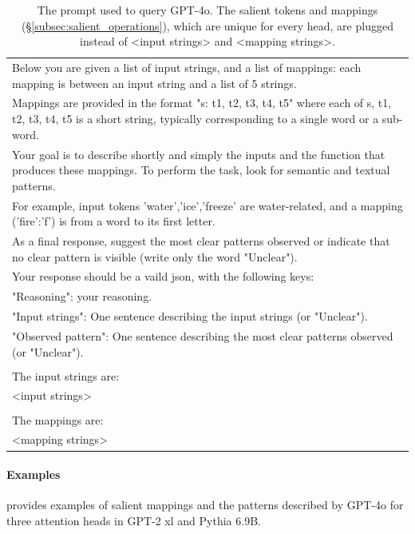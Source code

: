\documentclass[11pt]{article}
\newcommand{\PythiaSevenB}{Pythia 6.9B}
\newcommand{\GPTxl}{GPT-2 xl}
\newcommand{\GPTFourO}{GPT-4o}
\begin{document}
\begin{table}[htbp]
\footnotesize
\begin{tabularx}{\textwidth}{|X|}
\toprule 
Below you are given a list of input strings, and a list of mappings: each mapping is between an input string and a list of 5 strings. \\
Mappings are provided in the format "s: t1, t2, t3, t4, t5" where each of s, t1, t2, t3, t4, t5 is a short string, typically corresponding to a single word or a sub-word.\\
Your goal is to describe shortly and simply the inputs and the function that produces these mappings. To perform the task, look for semantic and textual patterns. \\
For example, input tokens 'water','ice','freeze' are water-related, and a mapping ('fire':'f') is from a word to its first letter.\\
As a final response, suggest the most clear patterns observed or indicate that no clear pattern is visible (write only the word "Unclear").\\
Your response should be a vaild json, with the following keys: \\
"Reasoning": your reasoning.\\
"Input strings": One sentence describing the input strings (or "Unclear").\\
"Observed pattern": One sentence describing the most clear patterns observed (or "Unclear").\\\\
The input strings are:\\
<input strings>\\\\
The mappings are:\\
<mapping strings>\\

\bottomrule

\end{tabularx}

\caption{The prompt used to query \GPTFourO{}. The salient tokens and mappings (\S\ref{subsec:salient_operations}), which are unique for every head, are plugged instead of <input strings> and <mapping strings>.}
\label{tab:gpt4o_prompt}
\end{table}

\paragraph{Examples}
 provides examples of salient mappings and the patterns described by \GPTFourO{} for three attention heads in \GPTxl{} and \PythiaSevenB{}.
\end{document}
